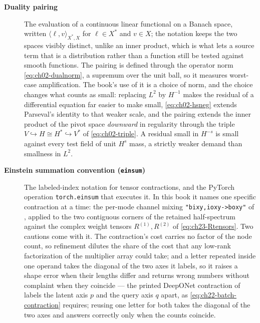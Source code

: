 \begin{description}
\item[\textbf{Duality pairing}] The evaluation of a continuous linear functional on a
Banach space, written $\langle \ell, v \rangle_{X^{*}, X}$ for $\ell \in X^{*}$ and
$v \in X$; the notation keeps the two spaces visibly distinct, unlike an inner product,
which is what lets a source term that is a distribution rather than a function still be
tested against smooth functions. The pairing is defined through the operator norm
\eqref{eq:ch02-dualnorm}, a supremum over the unit ball, so it measures worst-case
amplification. The book's use of it is a choice of norm, and the choice changes what
counts as small: replacing $L^{2}$ by $H^{-1}$ makes the residual of a differential
equation far easier to make small, \eqref{eq:ch02-hsneg} extends Parseval's identity to
that weaker scale, and the pairing extends the inner product of the pivot space
\emph{downward} in regularity through the triple $V \hookrightarrow H \cong H^{*}
\hookrightarrow V^{*}$ of \eqref{eq:ch02-triple}. A residual small in $H^{-s}$ is small
against every test field of unit $H^{s}$ mass, a strictly weaker demand than smallness in
$L^{2}$. 

\item[\textbf{Einstein summation convention (\texttt{einsum})}] The labeled-index
notation for tensor contractions, and the PyTorch operation \texttt{torch.einsum}
that executes it. In this book it names one specific contraction at a time: the
per-mode channel mixing \texttt{"bixy,ioxy->boxy"} of
, applied to the two
contiguous corners of the retained half-spectrum against the complex weight tensors
$R^{(1)}, R^{(2)}$ of \eqref{eq:ch23-Rtensors}. Two cautions come with it. The
contraction's cost carries no factor of the node count, so refinement dilutes the share
of the cost that any low-rank factorization of the multiplier array could take; and a letter
repeated inside one operand takes the diagonal of the two axes it labels, so it raises a shape error
when their lengths differ and returns wrong numbers without complaint when they
coincide --- the printed DeepONet contraction
of  labels the latent axis
$p$ and the query axis $q$ apart, as \eqref{eq:ch22-batch-contraction} requires; reusing
one letter for both takes the diagonal of the two axes and answers correctly only when the
counts coincide.


\end{description}
